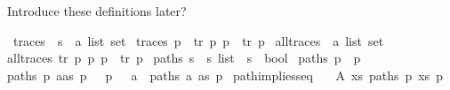 \begin{isabellebody}
\begin{isamarkuptext}%
Introduce these definitions later?%
\end{isamarkuptext}\isamarkuptrue%
\isamarkupfalse%
\ traces\ {\isacharcolon}{\kern0pt}{\isacharcolon}{\kern0pt}\ {\isacartoucheopen}{\isacharprime}{\kern0pt}s\ {\isasymRightarrow}\ {\isacharprime}{\kern0pt}a\ list\ set{\isacartoucheclose}\ \isanewline
{\isacartoucheopen}traces\ p\ {\isasymequiv}\ {\isacharbraceleft}{\kern0pt}tr{\isachardot}{\kern0pt}\ {\isasymexists}p{\isacharprime}{\kern0pt}{\isachardot}{\kern0pt}\ p\ {\isasymmapsto}{\isachardollar}{\kern0pt}\ tr\ p{\isacharprime}{\kern0pt}{\isacharbraceright}{\kern0pt}{\isacartoucheclose}\isanewline
\isanewline
{}\isamarkupfalse%
\ all{\isacharunderscore}{\kern0pt}traces\ {\isacharcolon}{\kern0pt}{\isacharcolon}{\kern0pt}\ {\isachardoublequoteopen}{\isacharprime}{\kern0pt}a\ list\ set{\isachardoublequoteclose}\ \isanewline
{\isachardoublequoteopen}all{\isacharunderscore}{\kern0pt}traces\ {\isasymequiv}{\isacharbraceleft}{\kern0pt}tr{\isachardot}{\kern0pt}\ {\isasymexists}p\ p{\isacharprime}{\kern0pt}{\isachardot}{\kern0pt}\ p\ {\isasymmapsto}{\isachardollar}{\kern0pt}\ tr\ p{\isacharprime}{\kern0pt}{\isacharbraceright}{\kern0pt}{\isachardoublequoteclose}\isanewline
\isanewline
{}\isamarkupfalse%
\ paths{\isacharcolon}{\kern0pt}{\isacharcolon}{\kern0pt}\ {\isacartoucheopen}{\isacharprime}{\kern0pt}s\ {\isasymRightarrow}\ {\isacharprime}{\kern0pt}s\ list\ {\isasymRightarrow}\ {\isacharprime}{\kern0pt}s\ {\isasymRightarrow}\ bool{\isacartoucheclose}\ \isanewline
{\isacartoucheopen}paths\ p\ {\isacharbrackleft}{\kern0pt}{\isacharbrackright}{\kern0pt}\ p{\isacartoucheclose}\ {\isacharbar}{\kern0pt}\isanewline
{\isacartoucheopen}paths\ p\ {\isacharparenleft}{\kern0pt}a{\isacharhash}{\kern0pt}as{\isacharparenright}{\kern0pt}\ p{\isacharprime}{\kern0pt}{\isacharprime}{\kern0pt}{\isacartoucheclose}\ \ {\isachardoublequoteopen}{\isasymexists}{\isasymalpha}{\isachardot}{\kern0pt}\ p\ {\isasymmapsto}\ {\isasymalpha}\ a\ {\isasymand}\ {\isacharparenleft}{\kern0pt}paths\ a\ as\ p{\isacharprime}{\kern0pt}{\isacharprime}{\kern0pt}{\isacharparenright}{\kern0pt}{\isachardoublequoteclose}\isanewline
\isanewline
{}\isamarkupfalse%
\ path{\isacharunderscore}{\kern0pt}implies{\isacharunderscore}{\kern0pt}seq{\isacharcolon}{\kern0pt}\isanewline
\ \ \ A{}{\isacharcolon}{\kern0pt}\ {\isachardoublequoteopen}{\isasymexists}xs{\isachardot}{\kern0pt}\ paths\ p\ xs\ p{\isacharprime}{\kern0pt}{\isachardoublequoteclose}\isanewline

\end{isabellebody}
